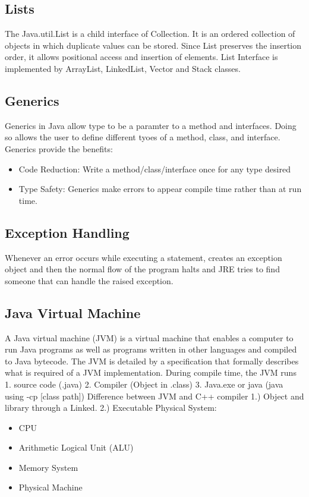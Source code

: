 \documentclass[a4paper, 11pt]{article}
\begin{document}
    \subsection{Lists}
        The Java.util.List is a child interface of Collection. It is an ordered collection of objects in which duplicate values can be stored. Since List preserves the insertion order, it allows positional access and insertion of elements. List Interface is implemented by ArrayList, LinkedList, Vector and Stack classes.

    \subsection{Generics}
        Generics in Java allow type to be a paramter to a method and interfaces.  Doing so allows the user to define different tyoes of a method, class, and interface.  Generics provide the benefits:
        \begin{itemize}
            \item Code Reduction: Write a method/class/interface once for any type desired
            \item Type Safety: Generics make errors to appear compile time rather than at run time.
        \end{itemize}

    \subsection{Exception Handling}
        Whenever an error occurs while executing a statement, creates an exception object and then the normal flow of the program halts and JRE tries to find someone that can handle the raised exception.

    \subsection{Java Virtual Machine}
        A Java virtual machine (JVM) is a virtual machine that enables a computer to run Java programs as well as programs written in other languages and compiled to Java bytecode. The JVM is detailed by a specification that formally describes what is required of a JVM implementation.
        \newline\newline
        During compile time, the JVM runs 1. source code (.java) 2. Compiler (Object in .class) 3. Java.exe or java (java using -cp [class path])
        \newline\newline
        Difference between JVM and C++ compiler 1.) Object and library through a Linked. 2.) Executable
        \newline\newline
        Physical System:
        \begin{itemize}
            \item CPU
            \item Arithmetic Logical Unit (ALU)
            \item Memory System
            \item Physical Machine
        \end{itemize}
\end{document}
